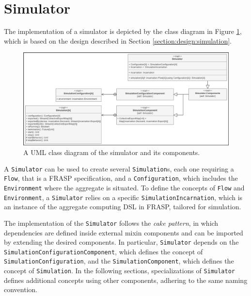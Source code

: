 
\section{Simulator}
\label{section:implementation:simulator}

The implementation of a simulator is depicted by the class diagram in Figure
\ref{figure:simulator-class-diagram}, which is based on the design described in
Section \ref{section:design:simulation}.

\begin{figure}[!ht]
  \centering
  \includegraphics[width=1\textwidth]{resources/figures/simulator-class-diagram.png}
  \caption{A UML class diagram of the simulator and its components.}
  \label{figure:simulator-class-diagram}
\end{figure}

A \texttt{Simulator} can be used to create several \texttt{Simulation}s, each
one requiring a \texttt{Flow}, that is a FRASP specification, and a
\texttt{Configuration}, which includes the \texttt{Environment} where the
aggregate is situated. To define the concepts of \texttt{Flow} and
\texttt{Environment}, a \texttt{Simulator} relies on a specific
\texttt{SimulationIncarnation}, which is an instance of the aggregate computing
\ac{DSL} in FRASP, tailored for simulation.

The implementation of the \texttt{Simulator} follows the \textit{cake pattern},
in which dependencies are defined inside external mixin components and can be
imported by extending the desired components. In particular, \texttt{Simulator}
depends on the \texttt{Simula\-tionConfigurationComponent}, which defines the
concept of \texttt{SimulationConfi\-guration}, and the
\texttt{SimulationCompo\-nent}, which defines the concept of
\texttt{Simula\-tion}. In the following sections, specializations of
\texttt{Simulator} defines additional concepts using other components, adhering
to the same naming convention.

